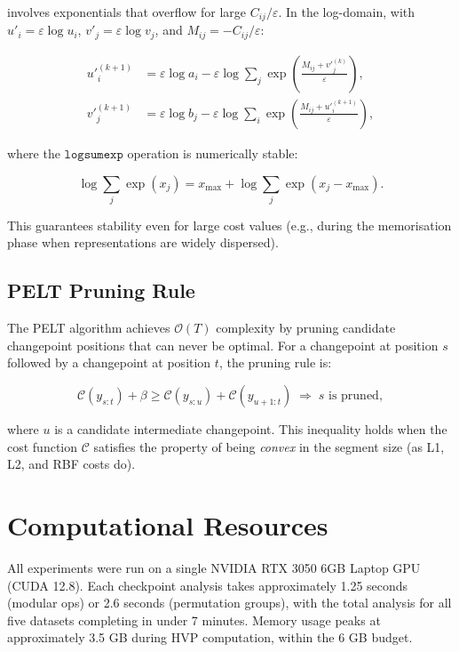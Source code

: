 \documentclass[12pt,twoside]{article}
\begin{document}
\begin{appendix}
involves exponentials that overflow for large $C_{ij}/\varepsilon$. In the
log-domain, with $u'_i = \varepsilon \log u_i$, $v'_j = \varepsilon \log v_j$,
and $M_{ij} = -C_{ij}/\varepsilon$:

\begin{align}
  u'^{(k+1)}_i &= \varepsilon \log a_i - \varepsilon \log\sum_j \exp\left(
    \frac{M_{ij} + v'^{(k)}_j}{\varepsilon} \right), \\
  v'^{(k+1)}_j &= \varepsilon \log b_j - \varepsilon \log\sum_i \exp\left(
    \frac{M_{ij} + u'^{(k+1)}_i}{\varepsilon} \right),
\end{align}

where the $\texttt{logsumexp}$ operation is numerically stable:

\begin{equation}
  \log\sum_j \exp(x_j)
  = x_{\max} + \log\sum_j \exp(x_j - x_{\max}).
\end{equation}

This guarantees stability even for large cost values (e.g., during the
memorisation phase when representations are widely dispersed).

\subsection{PELT Pruning Rule}

The PELT algorithm achieves $\mathcal{O}(T)$ complexity by pruning
candidate changepoint positions that can never be optimal. For a
changepoint at position $s$ followed by a changepoint at position $t$,
the pruning rule is:

\begin{equation}
  \mathcal{C}(y_{s:t}) + \beta \geq \mathcal{C}(y_{s:u}) + \mathcal{C}(y_{u+1:t})
  \;\Longrightarrow\; s \text{ is pruned},
\end{equation}

where $u$ is a candidate intermediate changepoint. This inequality holds
when the cost function $\mathcal{C}$ satisfies the property of being
\emph{convex} in the segment size (as L1, L2, and RBF costs do).

\section{Computational Resources}

All experiments were run on a single NVIDIA RTX 3050 6GB Laptop GPU (CUDA
12.8). Each checkpoint analysis takes approximately 1.25 seconds (modular
ops) or 2.6 seconds (permutation groups), with the total analysis for all
five datasets completing in under 7 minutes. Memory usage peaks at
approximately 3.5 GB during HVP computation, within the 6 GB budget.

\end{appendix}
\end{document}
